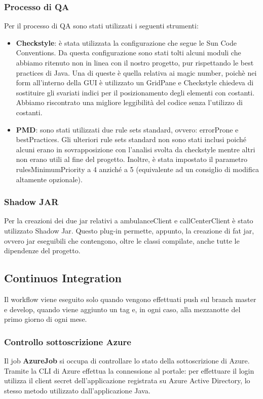 \documentclass[12pt]{article}
\begin{document}
\subsubsection{Processo di QA}
Per il processo di QA sono stati utilizzati i seguenti strumenti:
\begin{itemize}
    \item\textbf{Checkstyle}: è stata utilizzata la configurazione che segue le Sun Code Conventions. Da questa configurazione sono stati tolti alcuni moduli che abbiamo ritenuto non in linea con il nostro progetto, pur rispettando le best practices di Java. Una di queste è quella relativa ai magic number, poichè nei form all'interno della GUI è utilizzato un GridPane e Checkstyle chiedeva di sostituire gli svariati indici per il posizionamento degli elementi con costanti. Abbiamo riscontrato una migliore leggibilità del codice senza l'utilizzo di costanti.
    
    \item \textbf{PMD}: sono stati utilizzati due rule sets standard, ovvero: errorProne e bestPractices. Gli ulteriori rule sets standard non sono stati inclusi poiché alcuni erano in sovrapposizione con l'analisi svolta da checkstyle mentre altri non erano utili al fine del progetto.
    Inoltre, è stata impostato il parametro rulesMinimumPriority a 4 anziché a 5 (equivalente ad un consiglio di modifica altamente opzionale).
\end{itemize}

\subsubsection{Shadow JAR}
Per la creazioni dei due jar relativi a ambulanceClient e callCenterClient è stato utilizzato Shadow Jar.
Questo plug-in permette, appunto, la creazione di fat jar, ovvero jar eseguibili che contengono, oltre le classi compilate, anche tutte le dipendenze del progetto. 

\subsection{Continuos Integration}
Il workflow viene eseguito solo quando vengono effettuati push sul branch master e develop, quando viene aggiunto un tag e, in ogni caso, alla mezzanotte del primo giorno di ogni mese. 

\subsubsection{Controllo sottoscrizione Azure}
Il job \textbf{AzureJob} si occupa di controllare lo stato della sottoscrizione di Azure.
Tramite la CLI di Azure effettua la connessione al portale: per effettuare il login utilizza il client secret dell'applicazione registrata su Azure Active Directory, lo stesso metodo utilizzato dall'applicazione Java.
\end{document}
